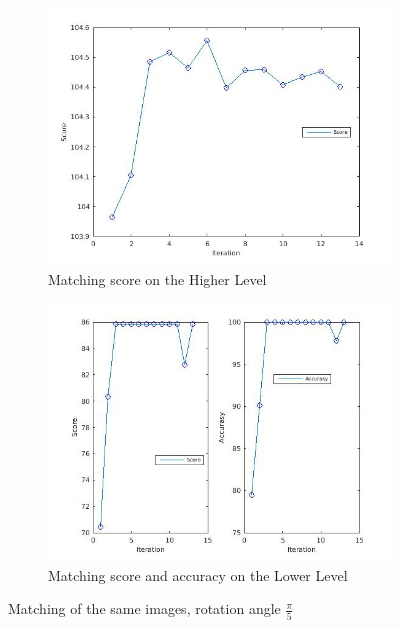 \documentclass[
	fontsize=12pt,
	paper=a4,
	twoside=false,
	numbers=noenddot,
	plainheadsepline,
	toc=listof,
	toc=bibliography
]{scrartcl}
\begin{document}
\begin{figure}[h]
	\begin{subfigure}[b]{0.5\textwidth}
		\centering
		\includegraphics[scale=0.25]{fig/method2/test_imagetrafo3/score_HL.jpg} 
		\caption{Matching score on the Higher Level} 
	\end{subfigure}%
	\begin{subfigure}[b]{0.5\textwidth}
		\centering
		\includegraphics[scale=0.25]{fig/method2/test_imagetrafo3/accuracy_LL.jpg} 
		\caption{Matching score and accuracy on the Lower Level} 
	\end{subfigure} 
	\caption{Matching of the same images, rotation angle $\frac{\pi}{5}$}	
\end{figure}
\FloatBarrier


	
\end{document}
